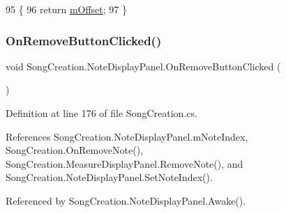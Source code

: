 \begin{DoxyCode}
95         \{
96             \textcolor{keywordflow}{return} \hyperlink{class_song_creation_1_1_note_display_panel_ae1943fcafd54133bbc3e387cc49473b8}{mOffset};
97         \}
\end{DoxyCode}
\mbox{\label{class_song_creation_1_1_note_display_panel_a496b2c412d05d2816dd733eeef4caa61}} 
\subsubsection{\texorpdfstring{On\+Remove\+Button\+Clicked()}{OnRemoveButtonClicked()}}
{\footnotesize\ttfamily void Song\+Creation.\+Note\+Display\+Panel.\+On\+Remove\+Button\+Clicked (\begin{DoxyParamCaption}{ }\end{DoxyParamCaption})}



Definition at line 176 of file Song\+Creation.\+cs.



References Song\+Creation.\+Note\+Display\+Panel.\+m\+Note\+Index, Song\+Creation.\+On\+Remove\+Note(), Song\+Creation.\+Measure\+Display\+Panel.\+Remove\+Note(), and Song\+Creation.\+Note\+Display\+Panel.\+Set\+Note\+Index().



Referenced by Song\+Creation.\+Note\+Display\+Panel.\+Awake().


